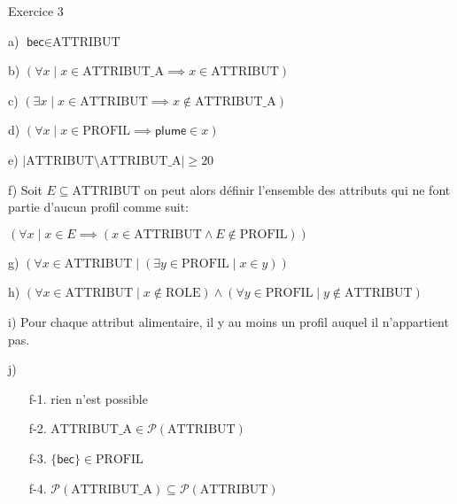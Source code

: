 \documentclass{article}
\begin{document}
\newcommand{\role}{\mbox{ROLE}}
\newcommand{\attribut}{\mbox{ATTRIBUT}}
\newcommand{\attributn}{\mbox{ATTRIBUT\_A}}
\newcommand{\profil}{\mbox{PROFIL}}

Exercice 3

\vspace{0.5cm}

a) $ \textsf{bec} \in \attribut $

\vspace{0.5cm}

b) $ (\forall x \mid x \in \attributn \implies x \in \attribut) $

\vspace{0.5cm}

c) $ (\exists x  \mid x \in \attribut \implies x \notin \attributn) $

\vspace{0.5cm}

d) $ (\forall x \mid x \in \profil \implies \textsf{plume} \in x) $

\vspace{0.5cm}

e) $ |\attribut \setminus \attributn | \geq 20 $

\vspace{0.5cm}

f)  Soit $E \subseteq \attribut$ on peut alors définir l'ensemble des attributs qui ne font partie d’aucun profil comme suit:

$(\forall x \mid x \in E \implies (x \in \attribut \land E \notin \profil ))  $

\vspace{0.5cm}

g) $(\forall x \in \attribut \mid (\exists y \in \profil \mid x \in y))$

\vspace{0.5cm}

h) $ (\forall x \in \attribut \mid x \notin \role) \land (\forall y \in \profil \mid y \notin \attribut) $

\vspace{0.5cm}

i) Pour chaque attribut alimentaire, il y au moins un profil auquel il n'appartient pas.

\vspace{0.5cm}

j)
\begin{itemize}
\item[f-1.] rien n’est possible
\item[f-2.] $\attributn \in \mathcal{P}(\attribut)$
\item[f-3.] $\{\textsf{bec}\} \in \profil$
\item[f-4.] $\mathcal{P}(\attributn) \subseteq \mathcal{P}(\attribut)$
\end{itemize}
\end{document}

